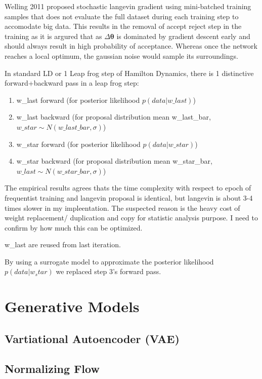 \documentclass[honours,12pt]{unswthesis}
\numberwithin{equation}{section}
\begin{document}
Welling 2011 \cite{StochGradLangevin} proposed stochastic langevin gradient using mini-batched training samples that does not evaluate the full dataset during each training step to accomodate big  data. This results in the removal of accept reject step in the training as it is argured that as $\Delta \bm{\theta}$ is dominated by gradient descent early and should always result in high probability of acceptance. Whereas once the network reaches a local optimum, the gaussian noise would sample its surroundings. 


In standard LD or 1 Leap frog step of Hamilton Dynamics, there is 1 distinctive forward+backward pass in a leap frog step:

\begin{enumerate}
    \item w\_last forward (for posterior likelihood $p(data|w\_last)$)
    \item w\_last backward (for proposal distribution mean w\_last\_bar,$w\_star \sim N(w\_last\_bar,\sigma)$) 
    \item w\_star forward (for posterior likelihood $p(data|w\_star)$)
    \item w\_star backward (for proposal distribution mean w\_star\_bar,$w\_last \sim N(w\_star\_bar,\sigma)$) 
\end{enumerate}

The empirical results agrees thats the time complexity with respect to epoch of frequentist training and langevin proposal is identical, but langevin is about 3-4 times slower in my impleentation. The suspected reason is the heavy cost of weight replacement/ duplication and copy for statistic analysis purpose. I need to confirm by how much this can be optimized. 

w\_last are reused from last iteration.

By using a surrogate model to approximate the posterior likelihood $p(data|w_star)$ we replaced step 3's forward pass.

\section{Generative Models}
\subsection{Vartiational Autoencoder (VAE)}
\subsection{Normalizing Flow}
\end{document}
